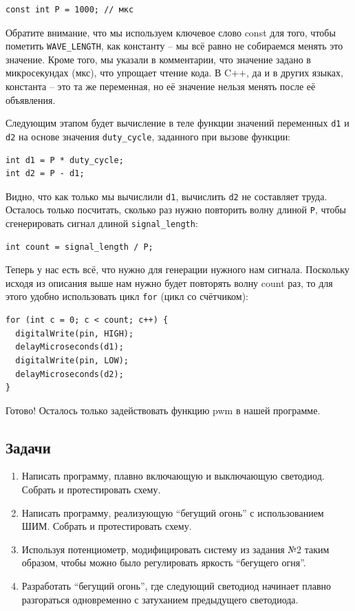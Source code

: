 \documentclass[a4paper,twoside]{book}
\begin{document}
\begin{verbatim}
const int P = 1000; // мкс
\end{verbatim}

Обратите внимание, что мы используем ключевое слово const для того, чтобы
пометить \texttt{WAVE\_LENGTH}, как константу -- мы всё равно не собираемся
менять это значение. Кроме того, мы указали в комментарии, что значение задано в
микросекундах (мкс), что упрощает чтение кода. В C++, да и в других языках,
константа -- это та же переменная, но её значение нельзя менять после её
объявления.

Следующим этапом будет вычисление в теле функции значений переменных \texttt{d1}
и \texttt{d2} на основе значения \texttt{duty\_cycle}, заданного при вызове
функции:

\begin{verbatim}
int d1 = P * duty_cycle;
int d2 = P - d1;
\end{verbatim}

Видно, что как только мы вычислили \texttt{d1}, вычислить \texttt{d2} не
составляет труда. Осталось только посчитать, сколько раз нужно повторить волну
длиной \texttt{P}, чтобы сгенерировать сигнал длиной \texttt{signal\_length}:

\begin{verbatim}
int count = signal_length / P;
\end{verbatim}

Теперь у нас есть всё, что нужно для генерации нужного нам сигнала. Поскольку
исходя из описания выше нам нужно будет повторять волну count раз, то для этого
удобно использовать цикл \texttt{for} (цикл со счётчиком):

\begin{verbatim}
for (int c = 0; c < count; c++) {
  digitalWrite(pin, HIGH);
  delayMicroseconds(d1);
  digitalWrite(pin, LOW);
  delayMicroseconds(d2);
}
\end{verbatim}

Готово! Осталось только задействовать функцию pwm в нашей программе.

\subsection{Задачи}

\begin{enumerate}
\item Написать программу, плавно включающую и выключающую светодиод. Собрать и
  протестировать схему. 
\item Написать программу, реализующую ``бегущий огонь'' с использованием ШИМ.
  Собрать и протестировать схему.
\item Используя потенциометр, модифицировать систему из задания №2 таким
  образом, чтобы можно было регулировать яркость ``бегущего огня''.
\item Разработать ``бегущий огонь'', где следующий светодиод начинает плавно
  разгораться одновременно с затуханием предыдущего светодиода.
\end{enumerate}
\end{document}
